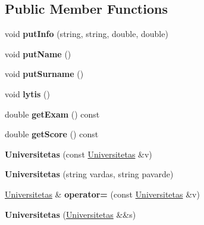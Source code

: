 \subsection*{Public Member Functions}
\begin{DoxyCompactItemize}
\item 
\mbox{\label{class_universitetas_a2b34b81645c6b2a191d7d610bf7d7683}} 
void {\bfseries put\+Info} (string, string, double, double)
\item 
\mbox{\label{class_universitetas_a9f5753aa27cf6cfabe0c809d41548e6a}} 
void {\bfseries put\+Name} ()
\item 
\mbox{\label{class_universitetas_a97b9db8f0b922a223d97b96210a0995b}} 
void {\bfseries put\+Surname} ()
\item 
\mbox{\label{class_universitetas_a5665b66fb2384226168412862228cc8b}} 
void {\bfseries lytis} ()
\item 
\mbox{\label{class_universitetas_a31b1ed81a12b27f72d613ea0f48531a7}} 
double {\bfseries get\+Exam} () const
\item 
\mbox{\label{class_universitetas_aa8dfbd314945b4aa3ccf95ee1df81440}} 
double {\bfseries get\+Score} () const
\item 
\mbox{\label{class_universitetas_a548268d8ba4a757ac35b6070307e6f63}} 
{\bfseries Universitetas} (const \mbox{\hyperlink{class_universitetas}{Universitetas}} \&v)
\item 
\mbox{\label{class_universitetas_a274794db6c14538a601b01f5997ba96e}} 
{\bfseries Universitetas} (string vardas, string pavarde)
\item 
\mbox{\label{class_universitetas_afb509db6593311f1183f6c1f0fabf7e7}} 
\mbox{\hyperlink{class_universitetas}{Universitetas}} \& {\bfseries operator=} (const \mbox{\hyperlink{class_universitetas}{Universitetas}} \&v)
\item 
\mbox{\label{class_universitetas_a0480354b12f0ae04b71f676d4f1425ec}} 
{\bfseries Universitetas} (\mbox{\hyperlink{class_universitetas}{Universitetas}} \&\&s)
\end{DoxyCompactItemize}
